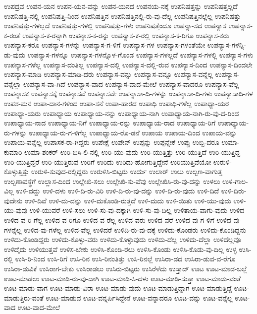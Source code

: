 {ಉಪದ್ರವ
ಉಪನ-ಯನ
ಉಪನ-ಯನ-ವನ್ನು
ಉಪನ-ಯನದ
ಉಪನಯ-ನಕ್ಕೆ
ಉಪನಿಷತ್ತನ್ನು
ಉಪನಿಷತ್ತಲ್ಲದೆ
ಉಪನಿಷತ್ತಿ-ನಲ್ಲಿ
ಉಪನಿಷತ್ತಿ-ನಿಂದ
ಉಪನಿಷತ್ತಿನ
ಉಪನಿಷತ್ತಿನಲ್ಲಿ-ರು-ವು-ದೆಲ್ಲ
ಉಪನಿಷತ್ತಿನಲ್ಲೆಲ್ಲ
ಉಪನಿಷತ್ತು
ಉಪನಿಷತ್ತು-ಗಳಲ್ಲದೆ
ಉಪನಿಷತ್ತು-ಗಳಲ್ಲಿ
ಉಪನಿಷತ್ತು-ಗಳು
ಉಪನಿಷತ್ತೆಂದೂ
ಉಪನ್ಯಾ-ಸದ
ಉಪನ್ಯಾಸ
ಉಪನ್ಯಾಸ-ಕ-ರಂತೆ
ಉಪನ್ಯಾಸ-ಕ-ರನ್ನಾಗಿ
ಉಪನ್ಯಾಸ-ಕ-ರನ್ನು
ಉಪನ್ಯಾಸ-ಕ-ರಲ್ಲಿ
ಉಪನ್ಯಾಸ-ಕ-ರಿಗೂ
ಉಪನ್ಯಾಸ-ಕರು
ಉಪನ್ಯಾಸ-ಕರೂ
ಉಪನ್ಯಾಸ-ಗಳನ್ನು
ಉಪನ್ಯಾಸ-ಗ-ಳಿಗೆ
ಉಪನ್ಯಾಸ-ಗಳ
ಉಪನ್ಯಾಸ-ಗಳಂತೆಯೇ
ಉಪನ್ಯಾಸ-ಗಳನ್ನಿ-ಡು-ವುದು
ಉಪನ್ಯಾಸ-ಗಳನ್ನೂ
ಉಪನ್ಯಾಸ-ಗಳನ್ನೊಳ-ಗೊಂಡ
ಉಪನ್ಯಾಸ-ಗಳಲ್ಲದೆ
ಉಪನ್ಯಾಸ-ಗಳಲ್ಲಿ
ಉಪನ್ಯಾಸ-ಗಳು
ಉಪನ್ಯಾಸ-ಗಳೆಲ್ಲ
ಉಪನ್ಯಾಸ-ದಂತಿಲ್ಲ
ಉಪನ್ಯಾಸ-ದಲ್ಲಿ
ಉಪನ್ಯಾಸ-ದಲ್ಲಿ-ರುವ
ಉಪನ್ಯಾಸ-ದಿಂದ
ಉಪನ್ಯಾಸ-ದಿಂದಲೇ
ಉಪನ್ಯಾಸ-ಮಾಡಿ
ಉಪನ್ಯಾಸ-ಮಾಡಿ-ದರು
ಉಪನ್ಯಾಸ-ವನ್ನು
ಉಪನ್ಯಾಸ-ವನ್ನೂ
ಉಪನ್ಯಾಸ-ವನ್ನೆಲ್ಲ
ಉಪನ್ಯಾಸ-ವನ್ನೆಲ್ಲಾ
ಉಪನ್ಯಾಸ-ವಾ-ಗಿದೆ
ಉಪನ್ಯಾಸ-ವಾದ
ಉಪನ್ಯಾಸ-ವಾದ-ಮೇಲೆ
ಉಪನ್ಯಾಸ-ವಾದರೂ
ಉಪನ್ಯಾಸ-ವೆಲ್ಲ
ಉಪನ್ಯಾಸಕ
ಉಪನ್ಯಾಸಕ್ಕೆ
ಉಪನ್ಯಾಸವೆ
ಉಪನ್ಯಾಸವೇ
ಉಪನ್ಯಾಸಾ-ದಿ-ಗಳನ್ನು
ಉಪನ್ಯಾಸಾ-ದಿ-ಗಳು
ಉಪನ್ಯಾಸಾದಿ-ಗಳ
ಉಪಶ-ಮನ
ಉಪಾ-ದಾನ-ಗಳಿಂದ
ಉಪಾ-ಸನೆ
ಉಪಾ-ಹಾರದ
ಉಪಾಧಿ
ಉಪಾಧಿ-ಗಳೆಲ್ಲ
ಉಪಾಧ್ಯಾ-ಯರ
ಉಪಾಧ್ಯಾ-ಯರು
ಉಪಾಧ್ಯಾಯ
ಉಪಾಧ್ಯಾಯ-ನನ್ನು
ಉಪಾಧ್ಯಾಯ-ನಾಗಿ
ಉಪಾಧ್ಯಾಯ-ನಾಗಿ-ರು-ವು-ದ-ರಿಂದ
ಉಪಾಧ್ಯಾಯ-ನಾದ
ಉಪಾಧ್ಯಾಯ-ನಿಗೆ
ಉಪಾಧ್ಯಾಯ-ರನ್ನು
ಉಪಾಧ್ಯಾಯ-ರಾದ
ಉಪಾಧ್ಯಾಯ-ರಿಗೆ
ಉಪಾಧ್ಯಾಯ-ರು-ಗಳನ್ನು
ಉಪಾಧ್ಯಾಯ-ರು-ಗ-ಳಿಗೆಲ್ಲ
ಉಪಾಧ್ಯಾಯ-ರೊ-ಡನೆ
ಉಪಾಯ
ಉಪಾಯ-ದಿಂದ
ಉಪಾಯ-ವನ್ನು
ಉಪಾಯ-ವನ್ನೆಲ್ಲ
ಉಪಾಸಕ-ರಾ-ಗಿದ್ದರು
ಉಪೇಕ್ಷೆ
ಉಪೇನ್
ಉಪ್ಪನ್ನು
ಉಪ್ಪನ್ನೇಕೆ
ಉಪ್ಪು
ಉಬ್ಬಿ-ದರೂ
ಉಮಾ-ಕುಮಾರಿ
ಉಮಾ-ಶಂಕರ್
ಉರಿ-ಬಿಸಿ-ಲಿ-ನಲ್ಲಿ
ಉರಿ-ಯು-ವುದು
ಉರಿ-ಯುತ್ತಿತ್ತು
ಉರಿ-ಯುತ್ತಿದೆ
ಉರಿ-ಯುತ್ತಿದ್ದ
ಉರಿ-ಯುತ್ತಿದ್ದರೆ
ಉರಿ-ಯುತ್ತಿರುವ
ಉರಿಗೆ
ಉರಿದು
ಉರಿದು-ಹೋಗುತ್ತಿದ್ದೇನೆ
ಉರಿಯುತ್ತಿವೆಯೋ
ಉರುಳಿ-ಕೊಳ್ಳುತ್ತಿತ್ತು
ಉರುಳಿ-ಸುವುದ-ರಲ್ಲಿದ್ದರು
ಉರುಳಿಸಿ-ಬಿಟ್ಟರು
ಉರ್ದು
ಉಲಾರ್
ಉಲು
ಉಲ್ಬಣ-ವಾಗುತ್ತ
ಉಲ್ಬಣಾವಸ್ಥೆಗೆ
ಉಲ್ಲಾಸ-ದಿಂದ
ಉಲ್ಲೇಖಿ-ಸಲು
ಉಲ್ಲೇಖಿ-ಸು-ವೆವು
ಉಲ್ಲೇಖಿಸಿ-ರು-ವು-ದನ್ನು
ಉಳಲು
ಉಳಿ-ಗಾಲ-ವಿಲ್ಲ
ಉಳಿ-ದದ್ದು
ಉಳಿ-ದಳು
ಉಳಿ-ದಿ-ರು-ವಿರಿ
ಉಳಿ-ದಿ-ರು-ವು-ದನ್ನು
ಉಳಿ-ದಿ-ರು-ವುದು
ಉಳಿ-ದಿದೆ
ಉಳಿ-ದಿರು-ವುದೇನು
ಉಳಿ-ದಿವೆ
ಉಳಿ-ದು-ದನ್ನು
ಉಳಿ-ದುಕೊಂಡಿ-ರುತ್ತದೆ
ಉಳಿ-ದುದು
ಉಳಿ-ಯಿತು
ಉಳಿ-ಯು-ವುದು
ಉಳಿ-ಯು-ವುವು
ಉಳಿ-ಯುವರೆ
ಉಳಿ-ಸಲು
ಉಳಿ-ಸು-ವು-ದಕ್ಕಾಗಿ
ಉಳಿ-ಸು-ವು-ದಿಲ್ಲ
ಉಳಿತಾಯ-ವಾಗು-ವುದು
ಉಳಿದ
ಉಳಿದ-ವ-ರಿ-ಗೆಲ್ಲ
ಉಳಿದ-ವ-ರಿಗೂ
ಉಳಿದ-ವ-ರೆಲ್ಲ
ಉಳಿದ-ವರು
ಉಳಿದ-ವರೆ
ಉಳಿದ-ವು-ಗ-ಳಿಗೆ
ಉಳಿದ-ವು-ಗಳನ್ನೆಲ್ಲ
ಉಳಿದ-ವು-ಗಳೆಲ್ಲ
ಉಳಿದ-ವೆಲ್ಲ
ಉಳಿದರೆ
ಉಳಿದಿ-ರು-ವು-ದಕ್ಕೆ
ಉಳಿದು-ಕೊಂಡರು
ಉಳಿದು-ಕೊಂಡಿದ್ದನು
ಉಳಿದು-ಕೊಂಡಿದ್ದರು
ಉಳಿದು-ಕೊಳ್ಳು-ವರು
ಉಳಿದು-ಕೊಳ್ಳುವುದು
ಉಳಿದು-ದೆಲ್ಲ
ಉಳಿದು-ದೆಲ್ಲಾ
ಉಳಿದೆಲ್ಲವೂ
ಉಳಿದೈದು
ಉಳಿಯುತ್ತವೆ
ಉಳಿಸ-ಬೇಕು
ಉಳಿಸಿ-ಕೊಂಡಿ-ರಲು
ಉಳಿಸಿ-ಕೊಂಡು
ಉಳಿಸಿ-ಕೊಡು-ವು-ದಿಲ್ಲ
ಉಳ್ಳ
ಉಸಿ-ರಲ್ಲಿ
ಉಸಿ-ರಿ-ನಿಂದ
ಉಸಿ-ರಿಗೆ
ಉಸಿ-ರಿನ
ಉಸಿ-ರಿನಂತಿತ್ತು
ಉಸಿ-ರಿನಲ್ಲೆ
ಉಸಿರಾ-ಡದ
ಉಸಿರಾ-ಡುವ-ವ-ರೆಗೂ
ಉಸಿರಾ-ಡುವಿಕೆ
ಉಸಿರಾಗ-ಬೇಕು
ಉಸಿರಾಡಲು
ಉಸಿರು-ಬಿಟ್ಟರು
ಉಸಿರೆಳೆದು
ಉಸ್ತಾದ್
ಊಟ
ಊಟ-ಮಾಡ-ಬಲ್ಲೆ
ಊಟ-ಮಾಡಲು
ಊಟ-ಮಾಡಿ-ರು-ವು-ದಾಗಿ
ಊಟ-ಮಾಡಿ-ಸಿ-ದಳು
ಊಟ-ಮಾಡಿ-ಸುತ್ತಾ
ಊಟ-ಮಾಡು-ವಂತೆ
ಊಟ-ಮಾಡು-ವಾಗ
ಊಟ-ಮಾಡು-ವಿರಾ
ಊಟ-ಮಾಡು-ವುದು
ಊಟ-ಮಾಡುತ್ತಿದ್ದಾಗ
ಊಟ-ಮಾಡುತ್ತಿದ್ದೆ
ಊಟ-ಮಾಡುತ್ತಿರು-ವಂತೆ
ಊಟ-ಮಾಡುವ
ಊಟ-ವನ್ನರ್ಪಿಸಿದ್ದೇನೆ
ಊಟ-ವನ್ನಾದರೂ
ಊಟ-ವನ್ನು
ಊಟ-ವನ್ನೆಲ್ಲ
ಊಟ-ವಾದ
ಊಟ-ವಾದ-ಮೇಲೆ
}
